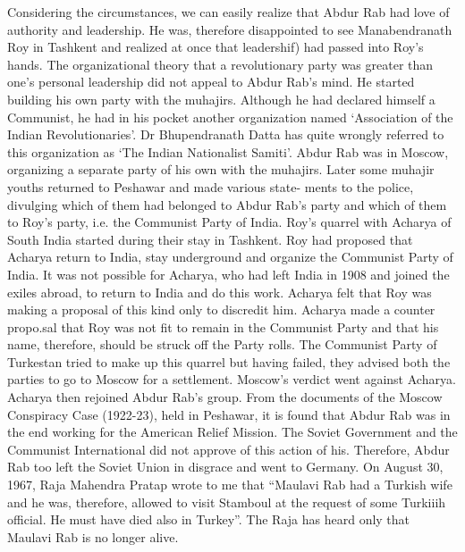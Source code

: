 Considering the circumstances, we can easily realize that Abdur Rab had love of authority and leadership. He was, therefore disappointed to see Manabendranath Roy in Tashkent and realized at once that leadershif) had passed into Roy’s hands. The organizational theory that a revolutionary party was greater than one’s personal leadership did not appeal to Abdur Rab’s mind. He started building his own party with the 
muhajirs. Although he had declared himself a Communist, he had in his pocket another organization named ‘Association of the Indian Revolutionaries’. Dr Bhupendranath Datta has quite wrongly referred to this organization as ‘The Indian Nationalist Samiti’. Abdur Rab was in Moscow, organizing a separate party of his own with the muhajirs. Later some muhajir youths returned to Peshawar and made various state- 
ments to the police, divulging which of them had belonged to Abdur Rab’s party and which of them to Roy’s party, i.e. the Communist Party of India. Roy’s quarrel with Acharya of South India started during their stay in Tashkent. Roy had proposed that Acharya return to India, stay underground and organize the Communist Party of India. It was not possible for Acharya, who had left India in 1908 and joined the exiles 
abroad, to return to India and do this work. Acharya felt that Roy was making a proposal of this kind only to discredit him. Acharya made a counter propo.sal that Roy was not fit to remain in the Communist Party and that his name, therefore, should be struck off the Party rolls. The Communist Party of Turkestan tried to make up this quarrel but having failed, they advised both the parties to go to Moscow for a settlement. Moscow’s verdict went against Acharya. Acharya then rejoined Abdur Rab’s group. From the documents of the Moscow Conspiracy 
Case (1922-23), held in Peshawar, it is found that Abdur Rab was in the end working for the American Relief Mission. The Soviet Government and the Communist International did not approve of this action of his. Therefore, Abdur Rab too left the Soviet Union in disgrace and went to Germany. On August 30, 1967, Raja Mahendra Pratap wrote to me that “Maulavi Rab had a Turkish wife and he was, therefore, allowed to visit 
Stamboul at the request of some Turkiiih official. He must have died also in Turkey”. The Raja has heard only that Maulavi Rab is no longer alive. 



